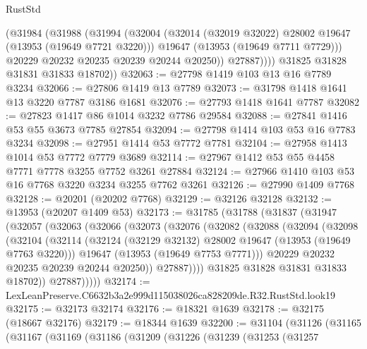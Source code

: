 \begin{lexlean}{RustStd}
\begin{coremodule}
              (@31984
                (@31988
                  (@31994
                    (@32004
                      (@32014 (@32019 @32022) @28002 @19647 (@13953 (@19649 @7721 @3220)))
                      @19647
                      (@13953 (@19649 @7711 @7729)))
                    @20229
                    @20232
                    @20235
                    @20239
                    @20244
                    @20250))
                @27887))))
        @31825
        @31828
        @31831
        @31833
        @18702))
@32063 := @27798 @1419 @103 @13 @16 @7789 @3234
@32066 := @27806 @1419 @13 @7789
@32073 := @31798 @1418 @1641 @13 @3220 @7787 @3186 @1681
@32076 := @27793 @1418 @1641 @7787
@32082 := @27823 @1417 @86 @1014 @3232 @7786 @29584
@32088 := @27841 @1416 @53 @55 @3673 @7785 @27854
@32094 := @27798 @1414 @103 @53 @16 @7783 @3234
@32098 := @27951 @1414 @53 @7772 @7781
@32104 := @27958 @1413 @1014 @53 @7772 @7779 @3689
@32114 := @27967 @1412 @53 @55 @4458 @7771 @7778 @3255 @7752 @3261 @27884
@32124 := @27966 @1410 @103 @53 @16 @7768 @3220 @3234 @3255 @7762 @3261
@32126 := @27990 @1409 @7768
@32128 := @20201 (@20202 @7768)
@32129 := @32126 @32128
@32132 := @13953 (@20207 @1409 @53)
@32173 := @31785
    (@31788
      (@31837
        (@31947
          (@32057
            (@32063
              (@32066
                (@32073
                  (@32076
                    (@32082
                      (@32088
                        (@32094
                          (@32098
                            (@32104
                              (@32114
                                (@32124 (@32129 @32132) @28002 @19647 (@13953 (@19649 @7763 @3220)))
                                @19647
                                (@13953 (@19649 @7753 @7771)))
                              @20229
                              @20232
                              @20235
                              @20239
                              @20244
                              @20250))
                          @27887))))
                  @31825
                  @31828
                  @31831
                  @31833
                  @18702))
              @27887)))))
@32174 := LexLeanPreserve.C6632b3a2e999d115038026ca828209de.R32.RustStd.look19
@32175 := @32173 @32174
@32176 := @18321 @1639
@32178 := @32175 (@18667 @32176)
@32179 := @18344 @1639
@32200 := @31104
    (@31126
      (@31165
        (@31167
          (@31169
            (@31186
              (@31209
                (@31226
                  (@31239
                    (@31253
                      (@31257

\end{coremodule}
\end{lexlean}
